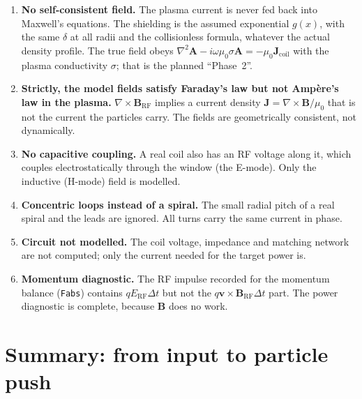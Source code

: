 \documentclass[11pt,a4paper]{article}
\newcommand{\code}[1]{\texttt{#1}}
\begin{document}
\begin{enumerate}
  \item \textbf{No self-consistent field.} The plasma current is never fed
        back into Maxwell's equations. The shielding is the assumed
        exponential $g(x)$, with the same $\delta$ at all radii and the
        collisionless formula, whatever the actual density profile. The
        true field obeys
        $\nabla^2\mathbf A - i\omega\mu_0\sigma\mathbf A = -\mu_0\mathbf J_{\mathrm{coil}}$
        with the plasma conductivity $\sigma$; that is the planned
        ``Phase~2''.
  \item \textbf{Strictly, the model fields satisfy Faraday's law but not
        Ampère's law in the plasma.} $\nabla\times\mathbf B_{\mathrm{RF}}$
        implies a current density $\mathbf J = \nabla\times\mathbf B/\mu_0$
        that is not the current the particles carry. The fields are
        geometrically consistent, not dynamically.
  \item \textbf{No capacitive coupling.} A real coil also has an RF voltage
        along it, which couples electrostatically through the window
        (the E-mode). Only the inductive (H-mode) field is modelled.
  \item \textbf{Concentric loops instead of a spiral.} The small radial
        pitch of a real spiral and the leads are ignored. All turns carry
        the same current in phase.
  \item \textbf{Circuit not modelled.} The coil voltage, impedance and
        matching network are not computed; only the current needed for the
        target power is.
  \item \textbf{Momentum diagnostic.} The RF impulse recorded for the
        momentum balance (\code{Fabs}) contains $qE_{\mathrm{RF}}\Delta t$
        but not the $q\mathbf v\times\mathbf B_{\mathrm{RF}}\Delta t$ part.
        The power diagnostic is complete, because $\mathbf B$ does no work.
\end{enumerate}

\section{Summary: from input to particle push}
\end{document}
